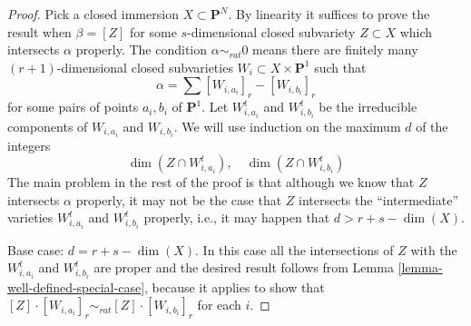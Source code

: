 \begin{proof}
Pick a closed immersion $X \subset \mathbf{P}^N$.
By linearity it suffices to prove the result when $\beta = [Z]$ for some
$s$-dimensional closed subvariety $Z \subset X$ which intersects $\alpha$
properly. The condition $\alpha \sim_{rat} 0$ means there
are finitely many $(r + 1)$-dimensional closed subvarieties
$W_i \subset X \times \mathbf{P}^1$ such that
$$
\alpha = \sum [W_{i, a_i}]_r - [W_{i, b_i}]_r
$$
for some pairs of points $a_i, b_i$ of $\mathbf{P}^1$.
Let $W_{i, a_i}^t$ and $W_{i, b_i}^t$ be the irreducible components
of $W_{i, a_i}$ and $W_{i, b_i}$.
We will use induction on the maximum $d$ of the integers
$$
\dim(Z \cap W_{i, a_i}^t),\quad \dim(Z \cap W_{i, b_i}^t)
$$
The main problem in the rest of the proof is that although we know that $Z$
intersects $\alpha$ properly, it may not be the case that $Z$ intersects the
``intermediate'' varieties $W_{i, a_i}^t$
and $W_{i, b_i}^t$ properly, i.e., it may happen that $d >  r + s - \dim(X)$.

\medskip\noindent
Base case: $d = r + s - \dim(X)$. In this case all the intersections of
$Z$ with the $W_{i, a_i}^t$ and $W_{i, b_i}^t$ are proper and the
desired result follows from Lemma \ref{lemma-well-defined-special-case},
because it applies to show that
$[Z] \cdot [W_{i, a_i}]_r \sim_{rat} [Z] \cdot [W_{i, b_i}]_r$ for
each $i$.


\end{proof}
